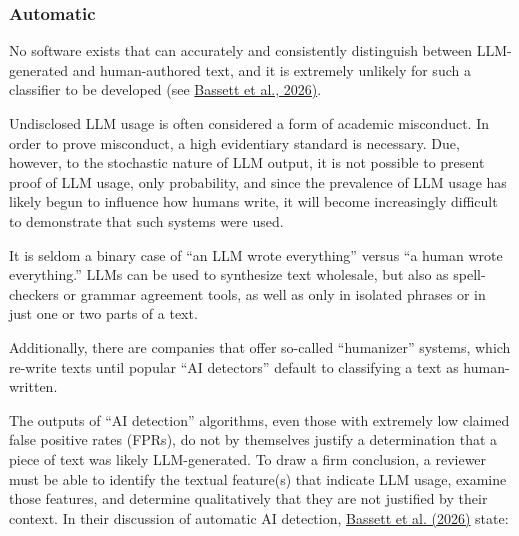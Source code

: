 \documentclass[letterpaper, 12pt]{article}
\begin{document}
\subsubsection*{Automatic}\label{automatic}

No software exists that can accurately and
consistently distinguish between LLM-generated and human-authored text, and it is extremely unlikely for such a classifier to be developed (see \href{https://doi.org/10.1080/1360080X.2026.2622146}{Bassett et al., 2026)}.

Undisclosed LLM usage is often considered a form of academic misconduct. In order to prove misconduct, a high evidentiary standard is necessary. Due, however, to the stochastic nature of LLM output, it is not possible to present proof of LLM usage, only probability, and since the prevalence of LLM usage has likely begun to influence how humans write, it will become increasingly difficult to demonstrate that such systems were used.


It is seldom a binary case of ``an LLM wrote everything'' versus ``a human wrote everything.'' LLMs can be used to synthesize text wholesale, but also as spell-checkers or grammar agreement tools, as well as only in isolated phrases or in just one or two parts of a text. 


Additionally, there are companies that offer so-called ``humanizer'' systems, which re-write
texts until popular ``AI detectors'' default to classifying a text as human-written.

The outputs of ``AI detection'' algorithms, even those with extremely low claimed false positive rates (FPRs), 
do not by themselves justify a determination that a piece of text was likely LLM-generated.
To draw a firm conclusion, a reviewer must be able to  identify the textual feature(s) that indicate LLM usage, examine those features,  and determine qualitatively that they are not justified by their context.
In their discussion of automatic AI detection, \href{https://doi.org/10.1080/1360080X.2026.2622146}{Bassett et al. (2026)} state:
\end{document}
